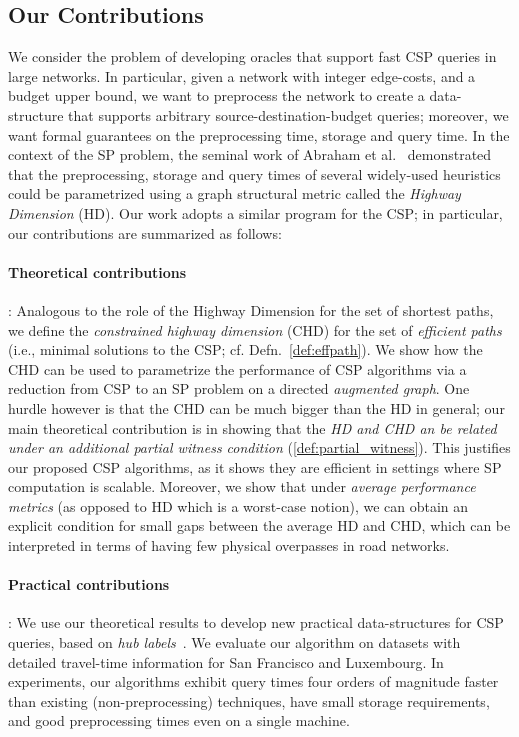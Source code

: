 \subsection{Our Contributions}
We consider the problem of developing oracles that support fast CSP queries in large networks. 
In particular, given a network with integer edge-costs, and a budget upper bound, we want to preprocess the network to create a data-structure that supports arbitrary source-destination-budget queries; moreover, we want formal guarantees on the preprocessing time, storage and query time.
 In the context of the SP problem, the seminal work of Abraham et al.~\cite{highway2013, highway2010} demonstrated that the preprocessing, storage and query times of several widely-used heuristics~\cite{dimacs09} could be parametrized using a graph structural metric called the \emph{Highway Dimension} (HD).
Our work adopts a similar program for the CSP; in particular, our contributions are summarized as follows:

\paragraph{Theoretical contributions}: 
Analogous to the role of the Highway Dimension for the set of shortest paths, we define the \emph{constrained highway dimension} (CHD) for the set of {\em efficient paths} (i.e., minimal solutions to the CSP; cf. Defn.~\ref{def:effpath}). 
We show how the CHD can be used to parametrize the performance of CSP algorithms via a reduction from CSP to an SP problem on a directed \emph{augmented graph}.
One hurdle however is that the CHD can be much bigger than the HD in general; our main theoretical contribution is in showing that the \emph{HD and CHD an be related under an additional partial witness condition} (\cref{def:partial_witness}). 
This justifies our proposed CSP algorithms, as it shows they are efficient in settings where SP computation is scalable. Moreover, we show that under \emph{average performance metrics} (as opposed to HD which is a worst-case notion), we can obtain an explicit condition for small gaps between the average HD and CHD, which can be interpreted in terms of having few physical overpasses in road networks.

\paragraph{Practical contributions}: 
We use our theoretical results to develop new practical data-structures for CSP queries, based on {\em hub labels}~\cite{cohen_definition_hl}. 
We evaluate our algorithm on datasets with detailed travel-time information for San Francisco and Luxembourg.
In experiments, our algorithms exhibit query times four orders of magnitude faster than existing (non-preprocessing) techniques, have small storage requirements, and good preprocessing times even on a single machine. 
 

